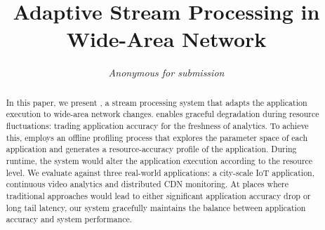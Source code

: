 \documentclass{sig-alternate-10pt}
\begin{document}



\title{Adaptive Stream Processing in Wide-Area Network}

\author{ \alignauthor \textit{Anonymous for submission} }

\maketitle

\begin{abstract}
  In this paper, we present \sysname{}, a stream processing system that adapts
  the application execution to wide-area network changes. \sysname{} enables
  graceful degradation during resource fluctuations: trading application
  accuracy for the freshness of analytics. To achieve this, \sysname{} employs
  an offline profiling process that explores the parameter space of each
  application and generates a resource-accuracy profile of the
  application. During runtime, the system would alter the application execution
  according to the resource level. We evaluate \sysname{} against three
  real-world applications: a city-scale IoT application, continuous video
  analytics and distributed CDN monitoring. At places where traditional
  approaches would lead to either significant application accuracy drop or long
  tail latency, our system gracefully maintains the balance between application
  accuracy and system performance.
\end{abstract}



% 
% 
% 
% 

% 

{}
\end{document}

